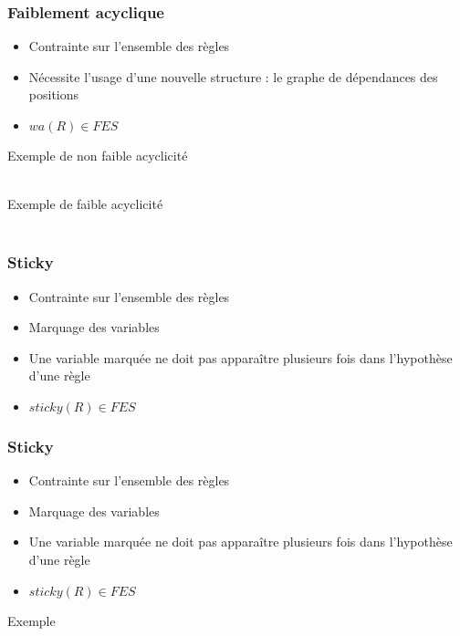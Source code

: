\begin{frame}
	\frametitle{Faiblement acyclique}
	\begin{itemize}
		\item Contrainte sur l'ensemble des règles
		\item Nécessite l'usage d'une nouvelle structure : le graphe de dépendances des
		positions
		\item $wa(R) \in FES$
	\end{itemize}
	\begin{exampleblock}{Exemple de non faible acyclicité}
		 \\
		 \\
	\end{exampleblock}
	\begin{exampleblock}{Exemple de faible acyclicité}
		 \\
		 \\
	\end{exampleblock}
\end{frame}

\begin{frame}
	\frametitle{Sticky}
	\begin{itemize}
		\item Contrainte sur l'ensemble des règles
		\item Marquage des variables
		\item Une variable marquée ne doit pas apparaître plusieurs fois dans l'hypothèse
		d'une règle
		\item $sticky(R) \in FES$
	\end{itemize}
	\vspace{10mm}
\end{frame}

\begin{frame}
	\frametitle{Sticky}
	\begin{itemize}
		\item Contrainte sur l'ensemble des règles
		\item Marquage des variables
		\item Une variable marquée ne doit pas apparaître plusieurs fois dans l'hypothèse
		d'une règle
		\item $sticky(R) \in FES$
	\end{itemize}
	\vspace{10mm}
	\begin{exampleblock}{Exemple}
		 \\
		 \\
	\end{exampleblock}
\end{frame}

